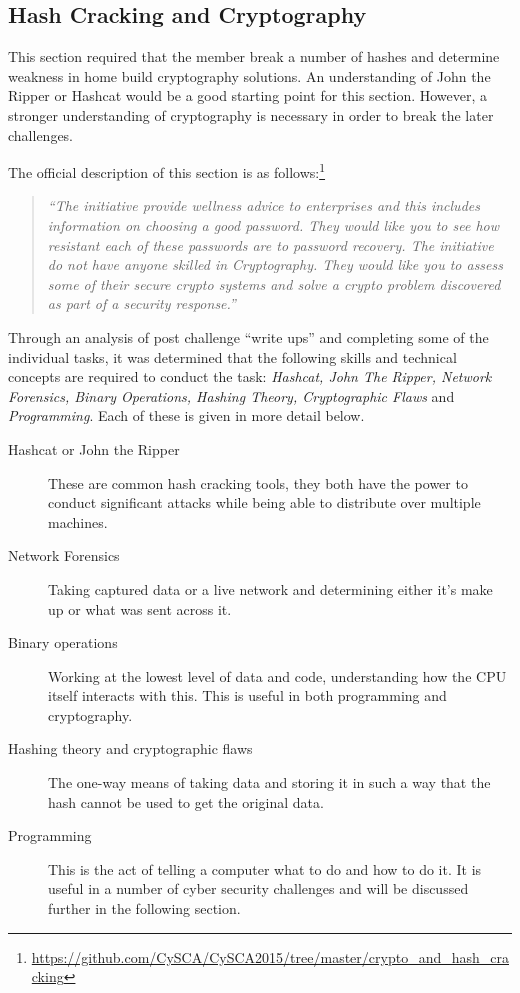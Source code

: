 \documentclass[twoside,a4paper,11pt]{report}
\begin{document}
		\subsection{Hash Cracking and Cryptography}
			This section required that the member break a number of hashes and determine weakness in home build cryptography solutions. 
			An understanding of John the Ripper or Hashcat would be a good starting point for this section. 
			However, a stronger understanding of cryptography is necessary in order to break the later challenges. 
			
			The official description of this section is as follows:\footnote{\url{https://github.com/CySCA/CySCA2015/tree/master/crypto\_and\_hash\_cracking}}
			\begin{quote}
				\textit{``The initiative provide wellness advice to enterprises and this includes information on choosing a good password. They would like you to see how resistant each of these passwords are to password recovery. The initiative do not have anyone skilled in Cryptography. They would like you to assess some of their secure crypto systems and solve a crypto problem discovered as part of a security response.''}
			\end{quote}

			Through an analysis of post challenge ``write ups'' and completing some of the individual tasks, 
			it was determined that the following skills and technical concepts are required to conduct the task: 
			\textit{Hashcat, John The Ripper, Network Forensics, Binary Operations, Hashing Theory, Cryptographic Flaws} and \textit{Programming}.
			Each of these is given in more detail below. 
			\begin{description}
				\item[Hashcat or John the Ripper] 
					These are common hash cracking tools, they both have the power to conduct significant attacks while being able to distribute over multiple machines. 
				\item[Network Forensics]
					Taking captured data or a live network and determining either it's make up or what was sent across it. 
				\item[Binary operations] 
					Working at the lowest level of data and code, understanding how the CPU itself interacts with this. 
					This is useful in both programming and cryptography. 
				\item[Hashing theory and cryptographic flaws]
					The one-way means of taking data and storing it in such a way that the hash cannot be used to get the original data. 
				\item[Programming]
					This is the act of telling a computer what to do and how to do it. 
					It is useful in a number of cyber security challenges and will be discussed further in the following section.
			\end{description}
\end{document}
